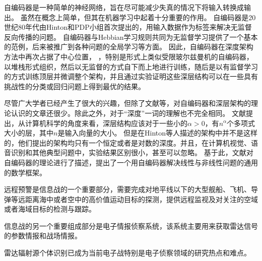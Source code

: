 自编码器是一种简单的神经网络，旨在尽可能减少失真的情况下将输入转换成输出。
虽然在概念上简单，但其在机器学习中起着十分重要的作用。
自编码器是20世纪80年代由Hinton和PDP小组首次提出的，用输入数据作为标签来解决无监督反向传播的问题。
自编码器与Hebbian学习规则共同为无监督学习提供了一个基本的范例，后来被推广到各种问题的全局学习等方面。
因此，自编码器在深度架构方法中再次占据了中心位置，
，特别是形式上类似受限玻尔兹曼机的自编码器，以堆栈形式组织，然后以无监督的方式自下而上地进行训练，随后是以有监督学习的方式训练顶层并微调整个架构，并且通过实验证明这些深层结构可以在一些具有挑战性的分类或回归问题上得到最优的结果。

尽管广大学者已经产生了很大的兴趣，但除了文献\cite{montufar2011refinements,sutskever2008deep,baldi1989neural}等，对自编码器和深层架构的理论认识的文章还很少。除此之外，对于“深度”一词的理解也不完全相同。
文献\cite{clote2013boolean}提出，从计算机科学的角度来看，深层结构应该对于一些小的$\alpha> 0$，有$n^\alpha$个多项式大小的层，其中$n$是输入向量的大小。
但是在Hinton等人描述的架构中并不是这样的，他们提出的架构均只有一个恒定或者是对数的深度。并且，在计算机视觉、语音识别和其他典型问题中，实验结果区别很小，甚至可以忽略。
基于此，文献\cite{baldi2012autoencoders}对自编码器的理论进行了描述，提出了一个用自编码器解决线性与非线性问题的通用的数学框架。

远程预警是信息战的一个重要部分，需要完成对地平线以下的大型舰船、飞机、导弹等远距离海中或者空中的高价值运动目标的探测，提供远程监视及对关注的空域或者海域目标的检测与跟踪。

信息战的另一个重要组成部分是电子情报侦察系统，该系统主要用来获取雷达信号的参数情报和战场情报。

雷达辐射源个体识别已成为当前电子战特别是电子侦察领域的研究热点和难点。
